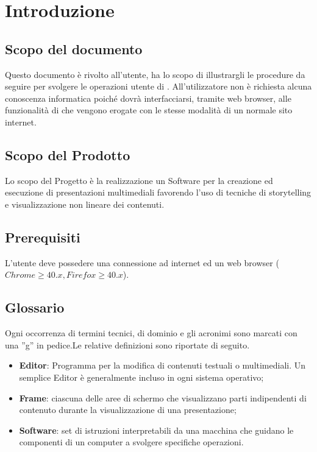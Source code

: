 \section{Introduzione}
\subsection{Scopo del documento}
Questo documento è rivolto all’utente, ha lo scopo di illustrargli le procedure da seguire per svolgere le operazioni utente di \premi . All'utilizzatore non è richiesta alcuna conoscenza informatica poiché dovrà interfacciarsi, tramite web browser, alle funzionalità di \premi che vengono erogate con le stesse modalità di un normale sito internet.
\subsection{Scopo del Prodotto}
Lo scopo del Progetto è la realizzazione un Software per la creazione ed esecuzione di presentazioni multimediali favorendo l’uso di tecniche di storytelling e visualizzazione non lineare dei contenuti.
\subsection{Prerequisiti}
\label{sec:prerequisiti}
L'utente deve possedere una connessione ad internet ed un web browser ($Chrome \geq 40.x, Firefox \geq 40.x$).
\subsection{Glossario}
Ogni occorrenza di termini tecnici, di dominio e gli acronimi sono marcati con una ''g'' in pedice.Le relative definizioni sono riportate di seguito.
\begin{itemize}
\item \textbf{Editor}: Programma per la modifica di contenuti testuali o multimediali. Un semplice Editor è generalmente incluso in ogni sistema operativo;
\item \textbf{Frame}: ciascuna delle aree di schermo che visualizzano parti indipendenti di contenuto durante la visualizzazione di una presentazione;
\item \textbf{Software}: set di istruzioni interpretabili da una macchina che guidano le componenti di un computer a svolgere specifiche operazioni.
\end{itemize}



